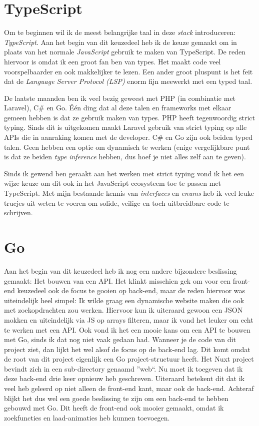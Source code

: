 \documentclass[a4paper]{report}
\begin{document}
    \section{TypeScript}
    Om te beginnen wil ik de meest belangrijke taal in deze \textit{stack} introduceren: \textit{TypeScript}.
    Aan het begin van dit keuzedeel heb ik de keuze gemaakt om in plaats van het normale \textit{JavaScript} gebruik te maken van TypeScript.
    De reden hiervoor is omdat ik een groot fan ben van types. Het maakt code veel voorspelbaarder en ook makkelijker te lezen.
    Een ander groot pluspunt is het feit dat de \textit{Language Server Protocol (LSP)} enorm fijn meewerkt met een typed taal.

    De laatste maanden ben ik veel bezig geweest met PHP (in combinatie met Laravel), C\# en Go. Één ding dat al deze talen en frameworks met elkaar gemeen hebben
    is dat ze gebruik maken van types. PHP heeft tegenwoordig strict typing. Sinds dit is uitgekomen maakt Laravel gebruik van strict typing op alle APIs die in aanraking komen met de developer.
    C\# en Go zijn ook beiden typed talen. Geen hebben een optie om dynamisch te werken (enige vergelijkbare punt is dat ze beiden \textit{type inference} hebben, dus hoef je niet alles zelf aan te geven).

    Sinds ik gewend ben geraakt aan het werken met strict typing vond ik het een wijze keuze om dit ook in het JavaScript ecosysteem toe te passen met TypeScript.
    Met mijn bestaande kennis van \textit{interfaces} en \textit{enums} heb ik veel leuke trucjes uit weten te voeren om solide, veilige en toch uitbreidbare code te schrijven.

    \section{Go}
    Aan het begin van dit keuzedeel heb ik nog een andere bijzondere beslissing gemaakt: Het bouwen van een API.
    Het klinkt misschien gek om voor een front-end keuzedeel ook de focus te gooien op back-end, maar de reden hiervoor was uiteindelijk heel simpel:
    Ik wilde graag een dynamische website maken die ook met zoekopdrachten zou werken. Hiervoor kun ik uiteraard gewoon een JSON mokken en uiteindelijk via JS op arrays filteren,
    maar ik vond het leuker om echt te werken met een API.
    Ook vond ik het een mooie kans om een API te bouwen met Go, sinds ik dat nog niet vaak gedaan had. Wanneer je de code van dit project ziet, dan lijkt het wel alsof de focus
    op de back-end lag. Dit komt omdat de root van dit project eigenlijk een Go project-structuur heeft. Het Nuxt project bevindt zich in een sub-directory genaamd ''web``.
    Nu moet ik toegeven dat ik deze back-end drie keer opnieuw heb geschreven. Uiteraard betekent dit dat ik veel heb geleerd op niet alleen de front-end kant, maar ook de back-end.
    Achteraf blijkt het dus wel een goede beslissing te zijn om een back-end te hebben gebouwd met Go. Dit heeft de front-end ook mooier gemaakt, omdat ik zoekfuncties en laad-animaties heb kunnen toevoegen.
\end{document}
